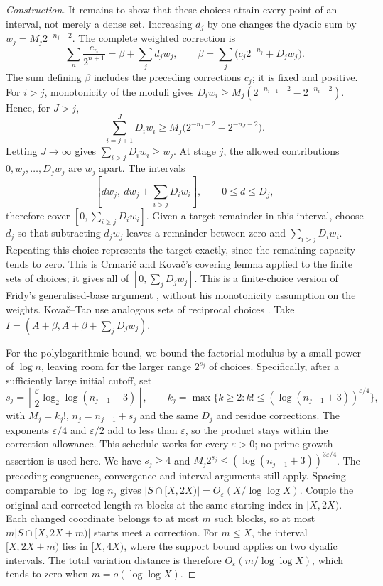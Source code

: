\documentclass[11pt]{article}
\begin{document}
\begin{proof}[Construction]
It remains to show that these choices attain every point of an interval,
not merely a dense set.  Increasing $d_j$ by one changes the dyadic sum by
$w_j=M_j2^{-n_j-2}$.  The complete weighted correction is
\[
 \sum_n\frac{e_n}{2^{n+1}}=\beta+\sum_jd_jw_j,
 \qquad \beta=\sum_j\bigl(c_j2^{-n_j}+D_jw_j\bigr).
\]
The sum defining $\beta$ includes the preceding corrections $c_j$;
it is fixed and positive.
For $i>j$, monotonicity of the moduli gives
$D_iw_i\ge M_j(2^{-n_{i-1}-2}-2^{-n_i-2})$.  Hence, for $J>j$,
\[
 \sum_{i=j+1}^{J}D_iw_i
 \ge M_j\bigl(2^{-n_j-2}-2^{-n_J-2}\bigr).
\]
Letting $J\to\infty$ gives $\sum_{i>j}D_iw_i\ge w_j$.
At stage $j$, the allowed contributions $0,w_j,\ldots,D_jw_j$
are $w_j$ apart.  The intervals
\[
 \left[d w_j,\ d w_j+\sum_{i>j}D_iw_i\right],\qquad 0\le d\le D_j,
\]
therefore cover $[0,\sum_{i\ge j}D_iw_i]$.  Given a target remainder in
this interval, choose $d_j$ so that subtracting $d_jw_j$ leaves a remainder
between zero and $\sum_{i>j}D_iw_i$.  Repeating this choice represents the
target exactly, since the remaining capacity tends to zero.  This is
Crmari\'{c} and Kova\v{c}'s covering lemma
\cite[Lemma~4]{crmarickovac2025} applied to the finite sets of choices;
it gives all of $[0,\sum_jD_jw_j]$.
This is a finite-choice version of Fridy's generalised-base argument
\cite[Lemma, p.~194]{fridy1966}, without his monotonicity assumption on the
weights.  Kova\v{c}--Tao use analogous sets of reciprocal choices
\cite[Lemma~5.1]{kovactao2024}.  Take
$I=(A+\beta,A+\beta+\sum_jD_jw_j)$.

For the polylogarithmic bound, we bound the factorial modulus by
a small power of $\log n$, leaving room for the larger range
$2^{s_j}$ of choices.  Specifically, after a sufficiently large initial
cutoff, set
\[
 s_j=\left\lfloor\frac{\varepsilon}{2}\log_2\log(n_{j-1}+3)\right\rfloor,
 \qquad
 k_j=\max\{k\ge2:k!\le(\log(n_{j-1}+3))^{\varepsilon/4}\},
\]
with $M_j=k_j!$, $n_j=n_{j-1}+s_j$ and the same $D_j$ and residue corrections.
The exponents $\varepsilon/4$ and $\varepsilon/2$ add to less than
$\varepsilon$, so the product stays within the correction allowance.
This schedule works for every $\varepsilon>0$; no prime-growth assertion
is used here.  We have $s_j\ge4$ and
$M_j2^{s_j}\le(\log(n_{j-1}+3))^{3\varepsilon/4}$.
The preceding congruence, convergence and interval arguments still apply.
Spacing comparable to $\log\log n_j$ gives
$|S\cap[X,2X)|=O_\varepsilon(X/\log\log X)$.
Couple the original and corrected length-$m$ blocks at the same starting
index in $[X,2X)$.  Each changed coordinate belongs to at most $m$ such
blocks, so at most $m|S\cap[X,2X+m)|$ starts meet a correction.
For $m\le X$, the interval $[X,2X+m)$ lies in $[X,4X)$, where the
support bound applies on two dyadic intervals.  The total variation
distance is therefore $O_\varepsilon(m/\log\log X)$, which tends to zero
when $m=o(\log\log X)$.
\end{proof}
\end{document}
